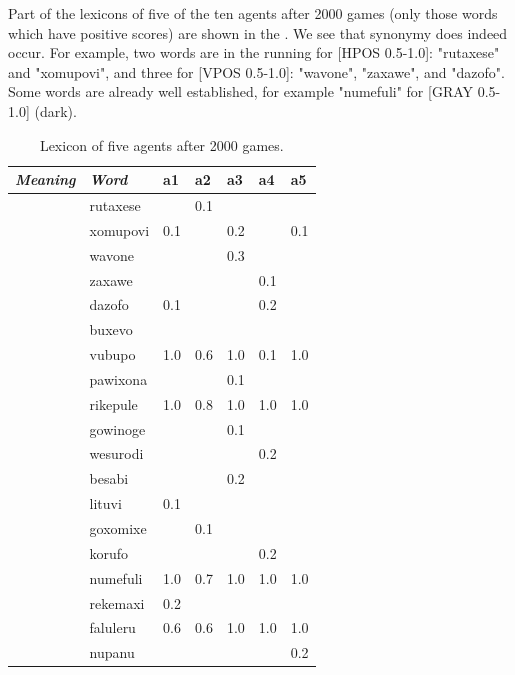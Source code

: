 Part of the lexicons of five of the ten agents after 2000 games 
(only those words which have positive scores) are shown in the 
. We see that synonymy does indeed occur. For
example, two words are in the 
running for [HPOS 0.5-1.0]: "rutaxese" and "xomupovi", and 
three for [VPOS 0.5-1.0]: "wavone", "zaxawe", and 
"dazofo". Some words are already well established, for
example "numefuli" for [GRAY 0.5-1.0] (dark). 
\begin{table}
\begin{center}
\begin{tabular}{ l  l  l  l  l  l  l  }
\lsptoprule
{\it Meaning}&{\it Word}&{\bf a1}&{\bf a2}&{\bf a3}&{\bf a4}&{\bf a5} \\ \midrule
[HPOS 0.5-1.0]&rutaxese& &0.1& & &\\ \midrule
 & xomupovi&0.1& &0.2& &0.1\\ \midrule
[VPOS 0.5-1.0]&wavone& & &0.3& &\\ \midrule
 & zaxawe& & & &0.1& \\ \midrule
 & dazofo&0.1& & &0.2&\\ \midrule
[WIDTH 0.0-0.5]&buxevo& & & & & \\ \midrule
 & vubupo&1.0&0.6&1.0&0.1&1.0\\ \midrule
[WIDTH 0.5-1.0]&pawixona& & &0.1& & \\ \midrule
 & rikepule&1.0&0.8&1.0&1.0&1.0\\ \midrule
[WIDTH 0.5-0.75]&gowinoge& & &0.1& &  \\ \midrule
 & wesurodi& & & &0.2&\\ \midrule
[WIDTH 0.75-1.0]&besabi& & &0.2& & \\ \midrule
 & lituvi&0.1& & & & \\ \midrule
[GRAY 0.5-0.75]&goxomixe& &0.1& & & \\ \midrule
 & korufo& & & &0.2&\\ \midrule
[GRAY 0.0-0.5]&numefuli&1.0&0.7&1.0&1.0&1.0\\ \midrule
[GRAY 0.0-0.25]&rekemaxi&0.2& & & & \\ \midrule
[GRAY 0.5-1.0]&faluleru&0.6&0.6&1.0&1.0&1.0\\ \midrule
 & nupanu& & & & &0.2 \\ \midrule
\end{tabular}
\caption{\label{tab:lex2000} Lexicon of five agents after 2000 games.}
\end{center}
\end{table}

